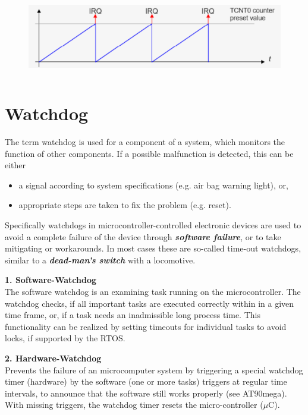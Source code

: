     \begin{figure}[h]
    \centering
    \includegraphics[width=12cm, height=3.5cm]{Images/image163.png}
    \label{fig:Fig 116}
    \end{figure}

\newpage
\section{Watchdog}

The term watchdog is used for a component of a system, which monitors the function of other components. If a possible malfunction is detected, this can be either 

\begin{itemize}
\item  a signal according to system specifications (e.g. air bag warning light), or, 
\item  appropriate steps are taken to fix the problem (e.g. reset).
\end{itemize}

Specifically watchdogs in microcontroller-controlled electronic devices are used to avoid a complete failure of the device through \textbf{\textit{software failure}}, or to take mitigating or workarounds. In most cases these are so-called time-out watchdogs, similar to a \textbf{\textit{dead-man's switch}} with a locomotive.\\

\os{\newpage}

{\rot\bf 1. Software-Watchdog}\\

The software watchdog is an examining task running on the microcontroller. The watchdog checks, if all important tasks are executed correctly within in a given time frame, or, if a task needs an inadmissible long process time. This functionality can be realized by setting timeouts for individual tasks to avoid locks, if supported by the RTOS.

{\rot\bf 2. Hardware-Watchdog}\\

Prevents the failure of an microcomputer system by triggering a special watchdog timer (hardware) by the software (one or more tasks) triggers at regular time intervals, to announce that the software still works properly (see AT90mega). With missing triggers, the watchdog timer resets the micro-controller ($\mu$C).

